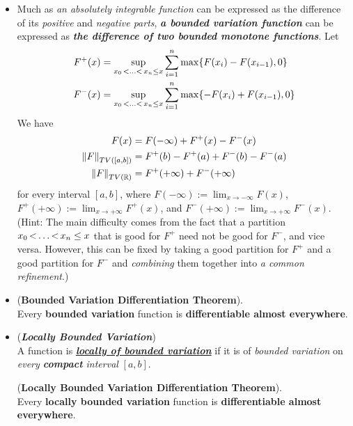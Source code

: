 \documentclass[11pt]{article}
\begin{document}
\begin{itemize}
\item \begin{remark}
Much as \emph{an absolutely integrable function} can be expressed as the difference of its \emph{positive} and \emph{negative parts}, \emph{\textbf{a bounded variation function}} can be expressed as \emph{\textbf{the difference of two bounded monotone functions}}. Let
\begin{align*}
F^{+}(x) &=  \sup\limits_{x_0 \,{<}\ldots{<}\, x_n \le x}\sum_{i=1}^{n}\max\{F(x_i) - F (x_{i-1}), 0\}\\
F^{-}(x) &=  \sup\limits_{x_0 \,{<}\ldots{<}\, x_n \le x}\sum_{i=1}^{n}\max\{-F(x_i) + F (x_{i-1}), 0\}
\end{align*}
We have 
\begin{align*}
F(x) &= F(-\infty) + F^{+}(x) - F^{-}(x)\\
\left\|F\right\|_{TV([a, b])}  &= F^{+}(b) - F^{+}(a) + F^{-}(b) - F^{-}(a)\\
\left\|F\right\|_{TV({\mathbb R})}  &= F^{+}(+\infty) + F^{-}(+\infty) 
\end{align*} for every interval $[a, b]$, where $F(-\infty) := \lim_{x\rightarrow-\infty} F(x)$, $F^{+}(+\infty) := \lim_{x\rightarrow+\infty} F^{+}(x)$, and $F^{-}(+\infty) := \lim_{x\rightarrow+\infty} F^{-}(x)$.  (Hint: The main difficulty comes from the fact that a partition $x_0 \,{<}\ldots{<}\, x_n \le x$ that
is good for $F^{+}$ need not be good for $F^{-}$, and vice versa. However, this can be fixed by taking a good partition for $F^{+}$ and a good partition
for $F^{-}$ and \emph{combining} them together into \emph{a common refinement}.)
\end{remark}

\item \begin{corollary} (\textbf{Bounded Variation Differentiation Theorem}). \\
Every \textbf{bounded variation} function is \textbf{differentiable almost everywhere}.
\end{corollary}

\item \begin{definition} (\emph{\textbf{Locally Bounded Variation}})\\
A function is \underline{\emph{\textbf{locally of bounded variation}}} if it is of \emph{bounded variation} on \emph{every \textbf{compact} interval} $[a, b]$. 
\end{definition}

\begin{corollary} (\textbf{Locally Bounded Variation Differentiation Theorem}). \\
Every \textbf{locally bounded variation} function is \textbf{differentiable almost everywhere}.
\end{corollary}


\end{itemize}
\end{document}
